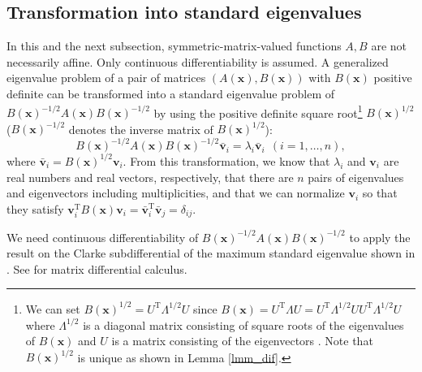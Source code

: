 \documentclass[sn-mathphys,Numbered]{sn-jnl}%
\theoremstyle{thmstyleone}%
\theoremstyle{thmstyletwo}%
\theoremstyle{thmstylethree}%
\newcommand{\e}[1]{\begin{equation}#1\end{equation}}
\def\tp{\mathrm{T}}
\begin{document}
\subsection{Transformation into standard eigenvalues}

In this and the next subsection, symmetric-matrix-valued functions $A,B$ are not necessarily affine. Only continuous differentiability is assumed. A generalized eigenvalue problem of a pair of matrices $(A(\bm{x}),B(\bm{x}))$ with $B(\bm{x})$ positive definite can be transformed into a standard eigenvalue problem of $B(\bm{x})^{-1/2}A(\bm{x})B(\bm{x})^{-1/2}$ by using the positive definite square root\footnote{We can set $B(\bm{x})^{1/2}=U^\tp\Lambda^{1/2}U$ since $B(\bm{x})=U^\tp\Lambda U=U^\tp\Lambda^{1/2}UU^\tp\Lambda^{1/2}U$ where $\Lambda^{1/2}$ is a diagonal matrix consisting of square roots of the eigenvalues of $B(\bm{x})$ and $U$ is a matrix consisting of the eigenvectors \cite{harville97}. Note that $B(\bm{x})^{1/2}$ is unique as shown in Lemma \ref{lmm_dif}.} $B(\bm{x})^{1/2}$ ($B(\bm{x})^{-1/2}$ denotes the inverse matrix of $B(\bm{x})^{1/2}$):
\e{
B(\bm{x})^{-1/2}A(\bm{x})B(\bm{x})^{-1/2}\bar{\bm{v}}_i=\lambda_i \bar{\bm{v}}_i\ \ (i=1,\ldots,n),
}
where $\bar{\bm{v}}_i=B(\bm{x})^{1/2}\bm{v}_i$. From this transformation, we know that $\lambda_i$ and $\bm{v}_i$ are real numbers and real vectors, respectively, that there are $n$ pairs of eigenvalues and eigenvectors including multiplicities, and that we can normalize $\bm{v}_i$ so that they satisfy $\bm{v}_i^\tp B(\bm{x})\bm{v}_i=\bar{\bm{v}}_i^\tp\bar{\bm{v}}_j=\delta_{ij}$.

We need continuous differentiability of $B(\bm{x})^{-1/2}A(\bm{x})B(\bm{x})^{-1/2}$ to apply the result on the Clarke subdifferential of the maximum standard eigenvalue shown in \cite{overton92}. See \cite{harville97} for matrix differential calculus.
\end{document}
